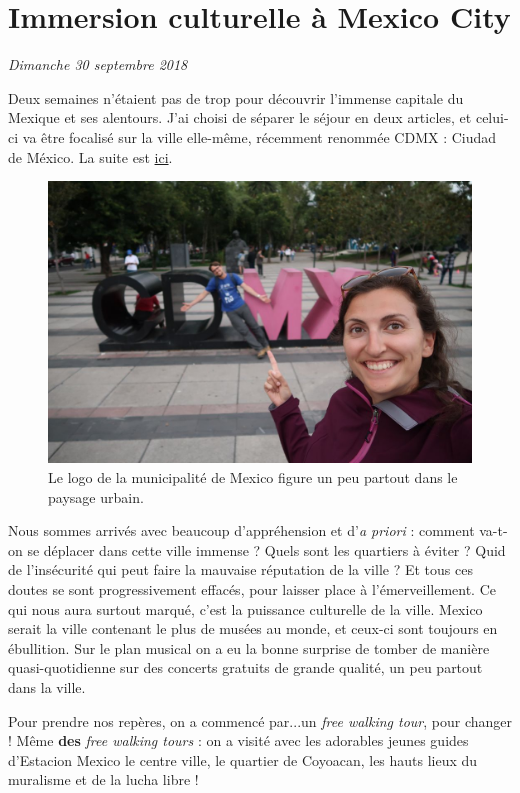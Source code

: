 \hypertarget{immersion-culturelle-uxe0-mexico-city}{%
\section{Immersion culturelle à Mexico
City}\label{immersion-culturelle-uxe0-mexico-city}}

\emph{Dimanche 30 septembre 2018}

Deux semaines n'étaient pas de trop pour découvrir l'immense capitale du
Mexique et ses alentours. J'ai choisi de séparer le séjour en deux
articles, et celui-ci va être focalisé sur la ville elle-même, récemment
renommée CDMX : Ciudad de México. La suite est
\href{/excursions-mexico.html}{ici}.

\begin{figure}
\centering
\includegraphics{images/20180930_cdmx.JPG}
\caption{Le logo de la municipalité de Mexico figure un peu partout dans
le paysage urbain.}
\end{figure}

Nous sommes arrivés avec beaucoup d'appréhension et d'\emph{a priori} :
comment va-t-on se déplacer dans cette ville immense ? Quels sont les
quartiers à éviter ? Quid de l'insécurité qui peut faire la mauvaise
réputation de la ville ? Et tous ces doutes se sont progressivement
effacés, pour laisser place à l'émerveillement. Ce qui nous aura surtout
marqué, c'est la puissance culturelle de la ville. Mexico serait la
ville contenant le plus de musées au monde, et ceux-ci sont toujours en
ébullition. Sur le plan musical on a eu la bonne surprise de tomber de
manière quasi-quotidienne sur des concerts gratuits de grande qualité,
un peu partout dans la ville.

Pour prendre nos repères, on a commencé par...un \emph{free walking
tour}, pour changer ! Même \textbf{des} \emph{free walking tours} : on a
visité avec les adorables jeunes guides d'Estacion Mexico le centre
ville, le quartier de Coyoacan, les hauts lieux du muralisme et de la
lucha libre !

